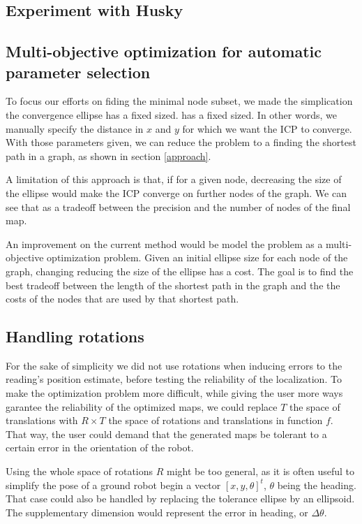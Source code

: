 \documentclass[letterpaper,10 pt,conference]{ieeeconf}
\begin{document}
\subsection{Experiment with Husky}

\subsection{Multi-objective optimization for automatic parameter selection}

To focus our efforts on fiding the minimal node subset, we made the simplication the convergence ellipse has a fixed sized.
has a fixed sized.  In other words, we manually specify the distance in $x$ and $y$ for which we
want the ICP to converge. With those parameters given, we can reduce the problem to a finding the
shortest path in a graph, as shown in section \ref{approach}.


A limitation of this approach is that, if for a given node, decreasing the size of the ellipse would
make the ICP converge on further nodes of the graph. We can see that as a tradeoff between the
precision and the number of nodes of the final map.


An improvement on the current method would be model the problem as a multi-objective optimization
problem. Given an initial ellipse size for each node of the graph, changing reducing the size of the
ellipse has a cost. The goal is to find the best tradeoff between the length of the shortest path in
the graph and the the costs of the nodes that are used by that shortest path.

\subsection{Handling rotations}

For the sake of simplicity we did not use rotations when inducing errors to the reading's
position estimate, before testing the reliability of the localization. To make the optimization
problem more difficult, while giving the user more ways garantee the reliability of the optimized
maps, we could replace $T$ the space of translations with $R \times T$ the space of rotations and
translations in function $f$. That way, the user could demand that the generated maps be tolerant to
a certain error in the orientation of the robot.

Using the whole space of rotations $R$ might be too general, as it is often useful to simplify the pose of a
ground robot begin a vector $[x, y, \theta]^t$, $\theta$ being the heading. That case could also be
handled by replacing the tolerance ellipse by an ellipsoid. The supplementary dimension would
represent the error in heading, or $\Delta \theta$.
\end{document}
